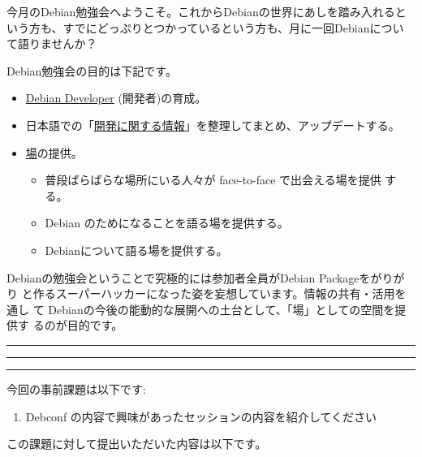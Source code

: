 \documentclass[mingoth,a4paper]{jsarticle}
\begin{document}
\begin{multicols}{2}
 

 今月のDebian勉強会へようこそ。これからDebianの世界にあしを踏み入れると
 いう方も、すでにどっぷりとつかっているという方も、月に一回Debianについ
 て語りませんか？

 Debian勉強会の目的は下記です。

 \begin{itemize}
 \item \underline{Debian Developer} (開発者)の育成。
 \item 日本語での「\underline{開発に関する情報}」を整理してまとめ、アップデートする。
 \item \underline{場}の提供。
 \begin{itemize}
  \item 普段ばらばらな場所にいる人々が face-to-face で出会える場を提供
	する。
  \item Debian のためになることを語る場を提供する。
  \item Debianについて語る場を提供する。
 \end{itemize}
 \end{itemize}		

 Debianの勉強会ということで究極的には参加者全員がDebian Packageをがりがり
 と作るスーパーハッカーになった姿を妄想しています。情報の共有・活用を通し
 て Debianの今後の能動的な展開への土台として、「場」としての空間を提供す
 るのが目的です。

\end{multicols}

\newpage

\begin{minipage}[b]{0.2\hsize}
 \colorbox{titleback}{}
\end{minipage}
\begin{minipage}[b]{0.8\hsize}
\hrule
\vspace{2mm}
\hrule
\begin{multicols}{2}
\tableofcontents
\end{multicols}
\vspace{2mm}
\hrule
\end{minipage}


今回の事前課題は以下です:
\begin{enumerate}
 \item Debconf の内容で興味があったセッションの内容を紹介してください
\end{enumerate}
この課題に対して提出いただいた内容は以下です。
\begin{multicols}{2}
{\small
 
}
\end{multicols}
\end{document}
